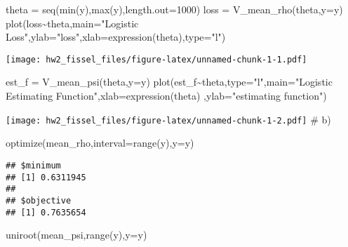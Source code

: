 \documentclass[
]{article}
\newenvironment{Shaded}{\begin{snugshade}}{\end{snugshade}}
\newcommand{\AttributeTok}[1]{\textcolor[rgb]{0.77,0.63,0.00}{#1}}
\newcommand{\DecValTok}[1]{\textcolor[rgb]{0.00,0.00,0.81}{#1}}
\newcommand{\FunctionTok}[1]{\textcolor[rgb]{0.00,0.00,0.00}{#1}}
\newcommand{\NormalTok}[1]{#1}
\newcommand{\OtherTok}[1]{\textcolor[rgb]{0.56,0.35,0.01}{#1}}
\newcommand{\SpecialCharTok}[1]{\textcolor[rgb]{0.00,0.00,0.00}{#1}}
\newcommand{\StringTok}[1]{\textcolor[rgb]{0.31,0.60,0.02}{#1}}
\begin{document}
\begin{Shaded}
\begin{Highlighting}[]
\NormalTok{theta }\OtherTok{=} \FunctionTok{seq}\NormalTok{(}\FunctionTok{min}\NormalTok{(y),}\FunctionTok{max}\NormalTok{(y),}\AttributeTok{length.out=}\DecValTok{1000}\NormalTok{)}
\NormalTok{loss }\OtherTok{=} \FunctionTok{V\_mean\_rho}\NormalTok{(theta,}\AttributeTok{y=}\NormalTok{y)}
\FunctionTok{plot}\NormalTok{(loss}\SpecialCharTok{\textasciitilde{}}\NormalTok{theta,}\AttributeTok{main=}\StringTok{"Logistic Loss"}\NormalTok{,}\AttributeTok{ylab=}\StringTok{"loss"}\NormalTok{,}\AttributeTok{xlab=}\FunctionTok{expression}\NormalTok{(theta),}\AttributeTok{type=}\StringTok{"l"}\NormalTok{)}
\end{Highlighting}
\end{Shaded}

\texttt{[image: hw2\_fissel\_files/figure-latex/unnamed-chunk-1-1.pdf]}

\begin{Shaded}
\begin{Highlighting}[]
\NormalTok{est\_f }\OtherTok{=} \FunctionTok{V\_mean\_psi}\NormalTok{(theta,}\AttributeTok{y=}\NormalTok{y)}
\FunctionTok{plot}\NormalTok{(est\_f}\SpecialCharTok{\textasciitilde{}}\NormalTok{theta,}\AttributeTok{type=}\StringTok{"l"}\NormalTok{,}\AttributeTok{main=}\StringTok{"Logistic Estimating Function"}\NormalTok{,}\AttributeTok{xlab=}\FunctionTok{expression}\NormalTok{(theta)}
\NormalTok{     ,}\AttributeTok{ylab=}\StringTok{"estimating function"}\NormalTok{)}
\end{Highlighting}
\end{Shaded}

\texttt{[image: hw2\_fissel\_files/figure-latex/unnamed-chunk-1-2.pdf]} \#
b)

\begin{Shaded}
\begin{Highlighting}[]
\FunctionTok{optimize}\NormalTok{(mean\_rho,}\AttributeTok{interval=}\FunctionTok{range}\NormalTok{(y),}\AttributeTok{y=}\NormalTok{y)}
\end{Highlighting}
\end{Shaded}

\begin{verbatim}
## $minimum
## [1] 0.6311945
## 
## $objective
## [1] 0.7635654
\end{verbatim}

\begin{Shaded}
\begin{Highlighting}[]
\FunctionTok{uniroot}\NormalTok{(mean\_psi,}\FunctionTok{range}\NormalTok{(y),}\AttributeTok{y=}\NormalTok{y)}
\end{Highlighting}
\end{Shaded}
\end{document}
